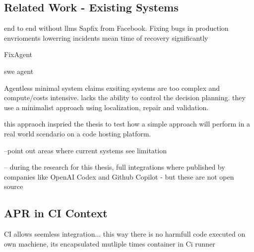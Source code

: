 \subsection{Related Work - Existing Systems}


end to end without llms Sapfix from Facebook. Fixing bugs in production envrioments lowerring incidents mean time of recovery significantly \cite{margineanSapFixAutomatedEndtoEnd2019}

FixAgent \cite{leeUnifiedDebuggingApproach2024}

swe agent \cite{yangSWEagentAgentComputerInterfaces2024}

Agentless minimal system \cite{xiaAgentlessDemystifyingLLMbased2024}
claims exsiting systems are too complex and compute/costs intensive.
lacks the ability to control the decision planning.
they use a minimalist approach using localization, repair and validation.


this appraoch inspried the thesis to test how a simple approach will perform in a real world scendario on a code hosting platform.


--point out areas where current systems see limitation

-- during the research for this thesis, full integrations where published by companies like OpenAI Codex and Github Copilot - but these are not open source


\subsection{APR in CI Context}

CI allows seemless integration...
this way there is no harmfull code executed on own machiene, its encapsulated mutliple times container in Ci runner
